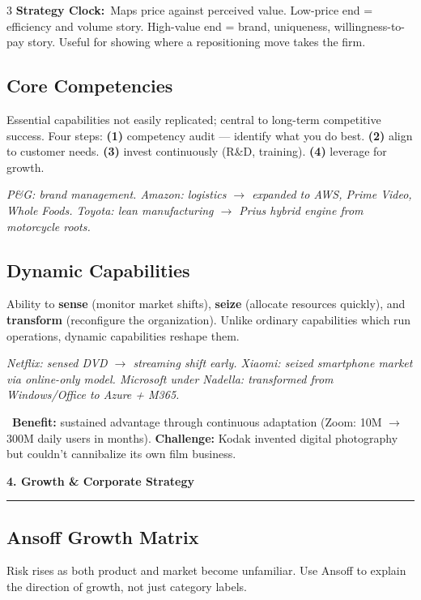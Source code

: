 \documentclass[7.6pt,letterpaper]{article}
\newcommand{\secbar}[1]{%
    \vspace{2pt}\noindent\textbf{#1}\par\vspace{1pt}\hrule\vspace{2pt}%
  }
\newcommand{\secbar}[1]{%
    \vspace{3pt}%
    \noindent\colorbox{navy}{\parbox{\dimexpr\linewidth-2\fboxsep}{%
      \fontsize{6.8pt}{8pt}\sffamily\bfseries\color{white}\strut\ #1\strut}}%
    \vspace{1pt}\par%
  }
\newcommand{\T}[1]{\textbf{\color{navy}#1}}
\newcommand{\kk}[2]{\noindent\T{#1}\ #2\par}
\newcommand{\bul}[1]{\noindent{\color{mid}$\triangleright$}\ #1\par}
\newcommand{\eg}[1]{\textit{\color{mid}#1}}
\newcommand{\good}[1]{\textcolor{sage}{\textbf{#1}}}
\newcommand{\bad}[1]{\textcolor{rust}{\textbf{#1}}}
\begin{document}
\begin{multicols}{3}
\kk{Strategy Clock:}{Maps price against perceived value. Low-price end = efficiency and volume story. High-value end = brand, uniqueness, willingness-to-pay story. Useful for showing where a repositioning move takes the firm.}

\subsection{Core Competencies}

Essential capabilities not easily replicated; central to long-term competitive success. Four steps: \T{(1)} competency audit --- identify what you do best. \T{(2)} align to customer needs. \T{(3)} invest continuously (R\&D, training). \T{(4)} leverage for growth.

\eg{P\&G: brand management. Amazon: logistics $\to$ expanded to AWS, Prime Video, Whole Foods. Toyota: lean manufacturing $\to$ Prius hybrid engine from motorcycle roots.}

\subsection{Dynamic Capabilities}

Ability to \T{sense} (monitor market shifts), \T{seize} (allocate resources quickly), and \T{transform} (reconfigure the organization). Unlike ordinary capabilities which run operations, dynamic capabilities reshape them.

\eg{Netflix: sensed DVD $\to$ streaming shift early. Xiaomi: seized smartphone market via online-only model. Microsoft under Nadella: transformed from Windows/Office to Azure + M365.}

\bul{\good{Benefit:} sustained advantage through continuous adaptation (Zoom: 10M $\to$ 300M daily users in months). \bad{Challenge:} Kodak invented digital photography but couldn't cannibalize its own film business.}

\secbar{4. Growth \& Corporate Strategy}

\subsection{Ansoff Growth Matrix}

Risk rises as both product and market become unfamiliar. Use Ansoff to explain the direction of growth, not just category labels.


\end{multicols}
\end{document}
